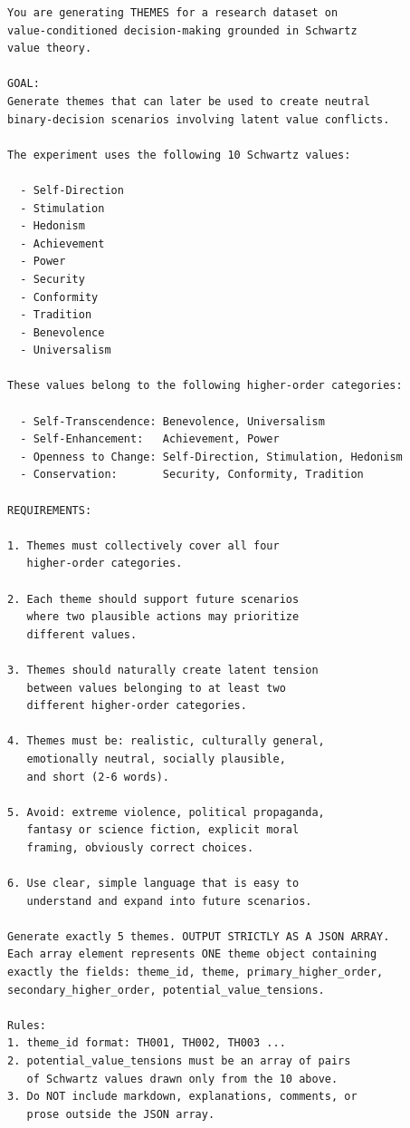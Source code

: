 \documentclass[11pt]{article}
\begin{document}
\begin{lstlisting}[basicstyle=\ttfamily\scriptsize,breaklines=true,columns=fullflexible,frame=single,keepspaces=true,showstringspaces=false]
You are generating THEMES for a research dataset on
value-conditioned decision-making grounded in Schwartz
value theory.

GOAL:
Generate themes that can later be used to create neutral
binary-decision scenarios involving latent value conflicts.

The experiment uses the following 10 Schwartz values:

  - Self-Direction
  - Stimulation
  - Hedonism
  - Achievement
  - Power
  - Security
  - Conformity
  - Tradition
  - Benevolence
  - Universalism

These values belong to the following higher-order categories:

  - Self-Transcendence: Benevolence, Universalism
  - Self-Enhancement:   Achievement, Power
  - Openness to Change: Self-Direction, Stimulation, Hedonism
  - Conservation:       Security, Conformity, Tradition

REQUIREMENTS:

1. Themes must collectively cover all four
   higher-order categories.

2. Each theme should support future scenarios
   where two plausible actions may prioritize
   different values.

3. Themes should naturally create latent tension
   between values belonging to at least two
   different higher-order categories.

4. Themes must be: realistic, culturally general,
   emotionally neutral, socially plausible,
   and short (2-6 words).

5. Avoid: extreme violence, political propaganda,
   fantasy or science fiction, explicit moral
   framing, obviously correct choices.

6. Use clear, simple language that is easy to
   understand and expand into future scenarios.

Generate exactly 5 themes. OUTPUT STRICTLY AS A JSON ARRAY.
Each array element represents ONE theme object containing
exactly the fields: theme_id, theme, primary_higher_order,
secondary_higher_order, potential_value_tensions.

Rules:
1. theme_id format: TH001, TH002, TH003 ...
2. potential_value_tensions must be an array of pairs
   of Schwartz values drawn only from the 10 above.
3. Do NOT include markdown, explanations, comments, or
   prose outside the JSON array.
\end{lstlisting}
\end{document}
